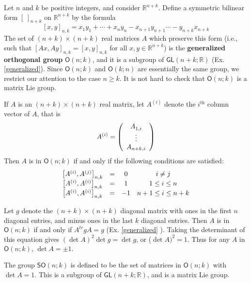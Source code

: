 \documentclass[12pt]{amsbook}
\theoremstyle{plain}
\numberwithin{equation}{chapter}
\numberwithin{theorem}{chapter}
\begin{document}
Let $n$ and $k$ be positive integers, and consider $\mathbb{R}^{n+k}$. Define
a symmetric bilinear form $\left[  \ \right]  _{n+k}$ on $\mathbb{R}^{n+k}$ by
the formula
\begin{equation}
\left[  x,y\right]  _{n,k}=x_{1}y_{1}+\cdots+x_{n}y_{n}-x_{n+1}y_{n+1}%
\cdots-y_{n+k}x_{n+k}\label{bilinear}%
\end{equation}
The set of $(n+k)\times(n+k)$ real matrices $A$ which preserve this form
(i.e., such that $\left[  Ax,Ay\right]  _{n,k}=\left[  x,y\right]  _{n,k}$ for
all $x,y\in\mathbb{R}^{n+k}$) is the \textbf{generalized orthogonal group}
$\mathsf{O}(n;k)$, and it is a subgroup of $\mathsf{GL}(n+k;\mathbb{R})$ (Ex.
\ref{generalized}). Since $\mathsf{O}(n;k)$ and $\mathsf{O}(k;n)$ are
essentially the same group, we restrict our attention to the case $n\geq k$.
It is not hard to check that $\mathsf{O}(n;k)$ is a matrix Lie group.

If $A$ is an $(n+k)\times(n+k)$ real matrix, let $A^{(i)}$ denote the
$i^{\text{th}}$ column vector of $A$, that is
\[
A^{(i)}=\left(
\begin{array}
[c]{c}%
A_{1,i}^{}\\
\vdots\\
A_{n+k,i}%
\end{array}
\right)
\]
Then $A$ is in $\mathsf{O}(n;k)$ if and only if the following conditions are
satisfied:
\begin{equation}%
\begin{array}
[c]{cccc}%
\left[  A^{(i)},A^{(j)}\right]  _{n,k} & = & 0 & i\neq j\\
\left[  A^{(i)},A^{(i)}\right]  _{n,k} & = & 1 & 1\leq i\leq n\\
\left[  A^{(i)},A^{(i)}\right]  _{n,k} & = & -1 & n+1\leq i\leq n+k
\end{array}
\end{equation}

Let $g$ denote the $(n+k)\times(n+k)$ diagonal matrix with ones in the first
$n$ diagonal entries, and minus ones in the last $k$ diagonal entries. Then
$A$ is in $\mathsf{O}(n;k)$ if and only if $A^{tr}gA=g$ (Ex. \ref{generalized}%
). Taking the determinant of this equation gives $(\det A)^{2}\det g=\det g$,
or ($\det A)^{2}=1$. Thus for any $A$ in $\mathsf{O}(n;k)$, $\det A=\pm1$.

The group $\mathsf{SO}(n;k)$ is defined to be the set of matrices in
$\mathsf{O}(n;k)$ with $\det A=1$. This is a subgroup of $\mathsf{GL}%
(n+k;\mathbb{R})$, and is a matrix Lie group.
\end{document}

